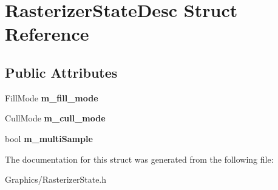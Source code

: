 \hypertarget{structRasterizerStateDesc}{}\section{Rasterizer\+State\+Desc Struct Reference}
\label{structRasterizerStateDesc}
\subsection*{Public Attributes}
\begin{DoxyCompactItemize}
\item 
\mbox{\label{structRasterizerStateDesc_a80d9ec55564ee774a9c5ebdf46610ca1}} 
Fill\+Mode {\bfseries m\+\_\+fill\+\_\+mode}
\item 
\mbox{\label{structRasterizerStateDesc_a494c3fd3b5838db829726e5d6cad3478}} 
Cull\+Mode {\bfseries m\+\_\+cull\+\_\+mode}
\item 
\mbox{\label{structRasterizerStateDesc_a798a5578fc4f6991a2170cb00655a0a9}} 
bool {\bfseries m\+\_\+multi\+Sample}
\end{DoxyCompactItemize}


The documentation for this struct was generated from the following file\+:\begin{DoxyCompactItemize}
\item 
Graphics/Rasterizer\+State.\+h\end{DoxyCompactItemize}
